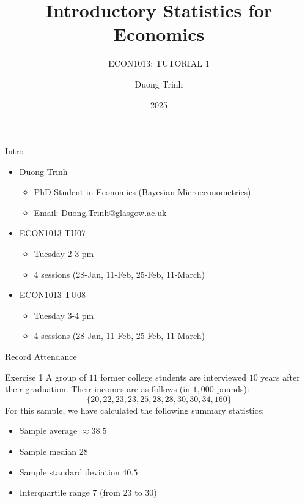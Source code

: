\documentclass[
  11pt,
  ignorenonframetext,
]{beamer}
\title{Introductory Statistics for Economics}
\subtitle{ECON1013: TUTORIAL 1}
\author{Duong Trinh}
\date{2025}
\institute{University of Glasgow}
\providecommand{\tightlist}{%
  \setlength{\itemsep}{0pt}\setlength{\parskip}{0pt}}
\begin{document}
\frame{\titlepage}

\begin{frame}{Intro}
\protect\hypertarget{intro}{}
\begin{itemize}
\tightlist
\item
  Duong Trinh

  \begin{itemize}
  \tightlist
  \item
    PhD Student in Economics (Bayesian Microeconometrics)
  \item
    Email: \underline{Duong.Trinh@glasgow.ac.uk}
  \end{itemize}
\end{itemize}

\vspace{3mm}

\begin{itemize}
\tightlist
\item
  ECON1013 TU07

  \begin{itemize}
  \tightlist
  \item
    Tuesday 2-3 pm
  \item
    4 sessions (28-Jan, 11-Feb, 25-Feb, 11-March)
  \end{itemize}
\item
  ECON1013-TU08

  \begin{itemize}
  \tightlist
  \item
    Tuesday 3-4 pm
  \item
    4 sessions (28-Jan, 11-Feb, 25-Feb, 11-March)
  \end{itemize}
\end{itemize}
\end{frame}

\begin{frame}{Record Attendance}
\protect\hypertarget{record-attendance}{}
\end{frame}

\begin{frame}{Exercise 1}
\protect\hypertarget{exercise-1}{}
A group of \(11\) former college students are interviewed \(10\) years
after their graduation. Their incomes are as follows (in \(1,000\)
pounds): \[
\{20, 22, 23, 23, 25, 28, 28, 30, 30, 34, 160\}
\] For this sample, we have calculated the following summary statistics:

\begin{itemize}
\item
  Sample average \(\approx 38.5\)
\item
  Sample median \(28\)
\item
  Sample standard deviation \(40.5\)
\item
  Interquartile range \(7\) (from \(23\) to \(30\))
\end{itemize}
\end{frame}
\end{document}
